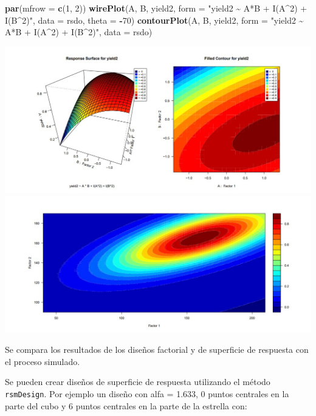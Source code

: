 \documentclass[
]{book}
\newenvironment{Shaded}{\begin{snugshade}}{\end{snugshade}}
\newcommand{\AttributeTok}[1]{\textcolor[rgb]{0.13,0.29,0.53}{#1}}
\newcommand{\DecValTok}[1]{\textcolor[rgb]{0.00,0.00,0.81}{#1}}
\newcommand{\FunctionTok}[1]{\textcolor[rgb]{0.13,0.29,0.53}{\textbf{#1}}}
\newcommand{\NormalTok}[1]{#1}
\newcommand{\SpecialCharTok}[1]{\textcolor[rgb]{0.81,0.36,0.00}{\textbf{#1}}}
\newcommand{\StringTok}[1]{\textcolor[rgb]{0.31,0.60,0.02}{#1}}
\begin{document}
\begin{Shaded}
\begin{Highlighting}[]
\FunctionTok{par}\NormalTok{(}\AttributeTok{mfrow =} \FunctionTok{c}\NormalTok{(}\DecValTok{1}\NormalTok{, }\DecValTok{2}\NormalTok{))}
\FunctionTok{wirePlot}\NormalTok{(A, B, yield2, }\AttributeTok{form =} \StringTok{"yield2 \textasciitilde{} A*B + I(A\^{}2) + I(B\^{}2)"}\NormalTok{, }\AttributeTok{data =}\NormalTok{ rsdo, }\AttributeTok{theta =} \SpecialCharTok{{-}}\DecValTok{70}\NormalTok{)}
\FunctionTok{contourPlot}\NormalTok{(A, B, yield2, }\AttributeTok{form =} \StringTok{"yield2 \textasciitilde{} A*B + I(A\^{}2) + I(B\^{}2)"}\NormalTok{, }\AttributeTok{data =}\NormalTok{ rsdo)}
\end{Highlighting}
\end{Shaded}

\includegraphics[width=7.29167in,height=\textheight]{graficos/dario1.jpg}
\includegraphics[width=7.29167in,height=\textheight]{graficos/dario2.jpg}

Se compara los resultados de los diseños factorial y de superficie de respuesta con el proceso simulado.

Se pueden crear diseños de superficie de respuesta utilizando el método \texttt{rsmDesign}. Por ejemplo un diseño con alfa = 1.633, 0 puntos centrales en la parte del cubo y 6 puntos centrales en la parte de la estrella con:
\end{document}
